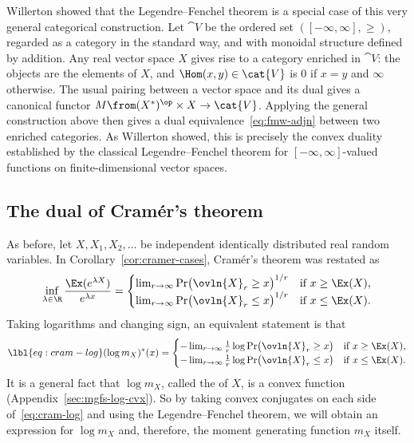 \begin{remarks}
\begin{enumerate}
Willerton showed that the Legendre--Fenchel theorem is a special case of
this very general categorical construction.  Let $\cat{V}$ be the ordered
set $([-\infty, \infty], \geq)$, regarded as a category in the standard
way, and with monoidal structure defined by addition.  Any real vector
space $X$ gives rise to a category enriched in $\cat{V}$: the objects are
the elements of $X$, and $\Hom(x, y) \in \cat{V}$ is $0$ if $x = y$
and $\infty$ otherwise.  The usual pairing between a vector space and its
dual gives a canonical functor $M \from (X^*)^\op \times X \to \cat{V}$.
Applying the general construction above then gives a dual
equivalence~\eqref{eq:fmw-adjn} between two enriched categories.  As
Willerton showed, this is precisely the convex duality established by the
classical Legendre--Fenchel theorem for $[-\infty, \infty]$-valued
functions on finite-dimensional vector spaces.
\end{enumerate}
\end{remarks}


\subsection*{The dual of Cram\'er's theorem}


As before, let $X, X_1, X_2, \ldots$ be independent identically distributed
real random variables.  In
Corollary~\ref{cor:cramer-cases}, Cram\'er's
theorem was restated as
\[
\inf_{\lambda \in \R} \frac{\Ex(e^{\lambda X})}{e^{\lambda x}}
=
\begin{cases}
\lim_{r \to \infty} \Pr\bigl(\ovln{X}_r \geq x\bigr)^{1/r}        &
\text{if } x \geq \Ex(X),       \\
\lim_{r \to \infty} \Pr\bigl(\ovln{X}_r \leq x\bigr)^{1/r}        &
\text{if } x \leq \Ex(X).
\end{cases}
\]
Taking logarithms and changing sign, an equivalent statement is that
% 
\begin{equation}
\lbl{eq:cram-log}
(\log m_X)^*(x)
=
\begin{cases}
- \lim_{r \to \infty} \tfrac{1}{r} \log \Pr\bigl(\ovln{X}_r \geq x\bigr)  &
\text{if } x \geq \Ex(X),       \\
- \lim_{r \to \infty} \tfrac{1}{r} \log \Pr\bigl(\ovln{X}_r \leq x\bigr)  &
\text{if } x \leq \Ex(X).       
\end{cases}
\end{equation}
% 
It is a general fact that $\log m_X$, called the
 of $X$, is a convex function
(Appendix~\ref{sec:mgfs-log-cvx}).  So by taking convex conjugates on each
side of~\eqref{eq:cram-log} and using the Legendre--Fenchel theorem, we
will obtain an expression for $\log m_X$ and, therefore, the moment
generating function $m_X$ itself.

